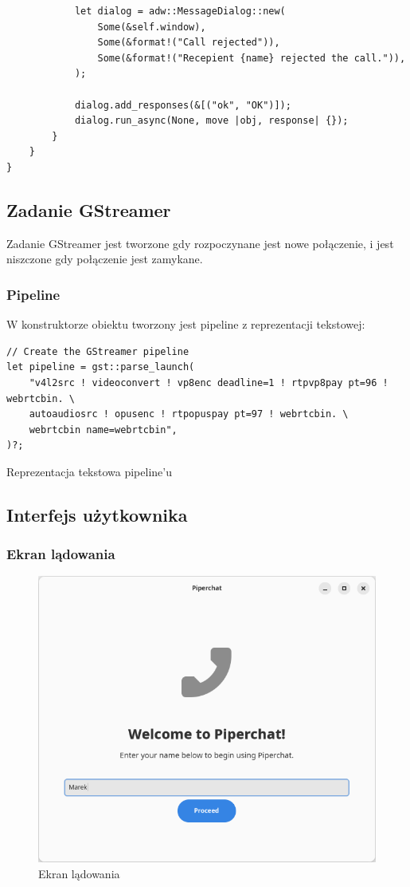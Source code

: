 \begin{verbatim}
            let dialog = adw::MessageDialog::new(
                Some(&self.window),
                Some(&format!("Call rejected")),
                Some(&format!("Recepient {name} rejected the call.")),
            );

            dialog.add_responses(&[("ok", "OK")]);
            dialog.run_async(None, move |obj, response| {});
        }
    }
}
\end{verbatim}

\subsection{Zadanie GStreamer}

Zadanie GStreamer jest tworzone gdy rozpoczynane jest nowe połączenie, i jest niszczone gdy
połączenie jest zamykane.

\subsubsection{Pipeline}

W konstruktorze obiektu tworzony jest pipeline z reprezentacji tekstowej:

\begin{listing}[H]
    \begin{verbatim}
// Create the GStreamer pipeline
let pipeline = gst::parse_launch(
    "v4l2src ! videoconvert ! vp8enc deadline=1 ! rtpvp8pay pt=96 ! webrtcbin. \
    autoaudiosrc ! opusenc ! rtpopuspay pt=97 ! webrtcbin. \
    webrtcbin name=webrtcbin",
)?;
\end{verbatim}
    \caption{Reprezentacja tekstowa pipeline'u}
\end{listing}

\subsection{Interfejs użytkownika}

\subsubsection{Ekran lądowania}

\begin{figure}[H]
    \centering
    \includegraphics[width=.5\textwidth]{img/gui/screen_landing}
    \caption{Ekran lądowania}
\end{figure}

